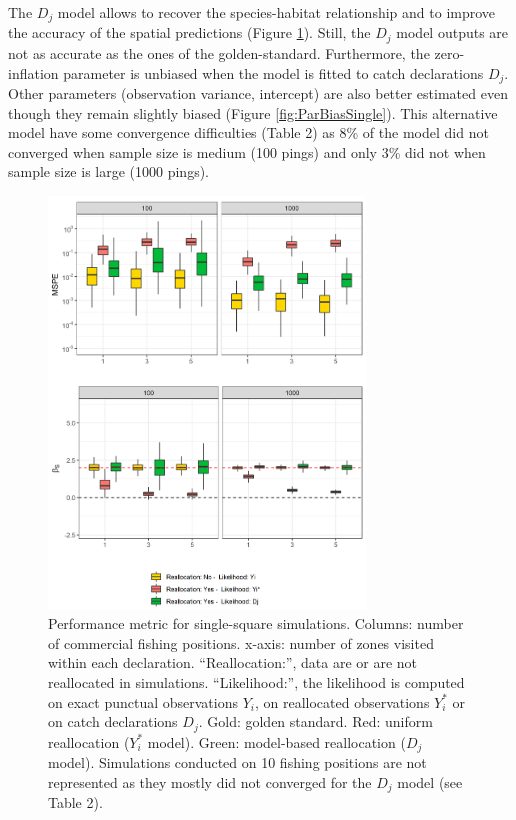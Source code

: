 \documentclass[
  english,
  man,floatsintext]{apa6}
\begin{document}
The \(D_j\) model allows to recover the species-habitat relationship and to improve the accuracy of the spatial predictions (Figure \ref{fig:PerfMetricSingle}). Still, the \(D_j\) model outputs are not as accurate as the ones of the golden-standard. Furthermore, the zero-inflation parameter is unbiased when the model is fitted to catch declarations \(D_j\). Other parameters (observation variance, intercept) are also better estimated even though they remain slightly biased (Figure \ref{fig:ParBiasSingle}). This alternative model have some convergence difficulties (Table 2) as 8\% of the model did not converged when sample size is medium (100 pings) and only 3\% did not when sample size is large (1000 pings).

\begin{figure}
\centering
\includegraphics[width=0.75\textwidth,height=\textheight]{images/Perf.metric_single_square.png}
\caption{\label{fig:PerfMetricSingle} Performance metric for single-square simulations. Columns: number of commercial fishing positions. x-axis: number of zones visited within each declaration. \enquote{Reallocation:}, data are or are not reallocated in simulations. \enquote{Likelihood:}, the likelihood is computed on exact punctual observations \(Y_i\), on reallocated observations \(Y_i^*\) or on catch declarations \(D_j\). Gold: golden standard. Red: uniform reallocation (\(Y_i^*\) model). Green: model-based reallocation (\(D_j\) model). Simulations conducted on 10 fishing positions are not represented as they mostly did not converged for the \(D_j\) model (see Table 2).}
\end{figure}
\end{document}
